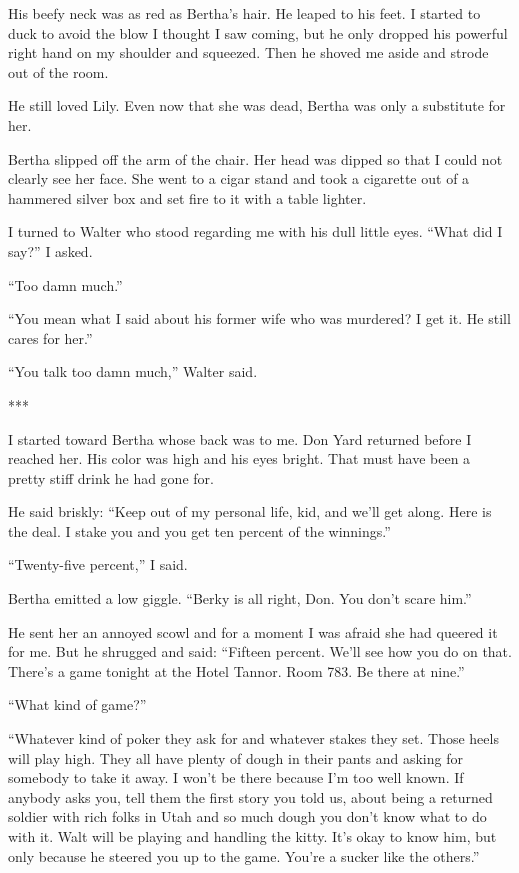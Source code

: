 \documentclass{novel}
\begin{document}
His beefy neck was as red as Bertha’s hair. He leaped to his feet. I started to duck to avoid the blow I thought I saw coming, but he only dropped his powerful right hand on my shoulder and squeezed. Then he shoved me aside and strode out of the room.

He still loved Lily. Even now that she was dead, Bertha was only a substitute for her.

Bertha slipped off the arm of the chair. Her head was dipped so that I could not clearly see her face. She went to a cigar stand and took a cigarette out of a hammered silver box and set fire to it with a table lighter.

I turned to Walter who stood regarding me with his dull little eyes. “What did I say?” I asked.

“Too damn much.”

“You mean what I said about his former wife who was murdered? I get it. He still cares for her.”

“You talk too damn much,” Walter said.

***

I started toward Bertha whose back was to me. Don Yard returned before I reached her. His color was high and his eyes bright. That must have been a pretty stiff drink he had gone for.

He said briskly: “Keep out of my personal life, kid, and we’ll get along. Here is the deal. I stake you and you get ten percent of the winnings.”

“Twenty-five percent,” I said.

Bertha emitted a low giggle. “Berky is all right, Don. You don’t scare him.”

He sent her an annoyed scowl and for a moment I was afraid she had queered it for me. But he shrugged and said: “Fifteen percent. We’ll see how you do on that. There’s a game tonight at the Hotel Tannor. Room 783. Be there at nine.”

“What kind of game?”

“Whatever kind of poker they ask for and whatever stakes they set. Those heels will play high. They all have plenty of dough in their pants and asking for somebody to take it away. I won’t be there because I’m too well known. If anybody asks you, tell them the first story you told us, about being a returned soldier with rich folks in Utah and so much dough you don’t know what to do with it. Walt will be playing and handling the kitty. It’s okay to know him, but only because he steered you up to the game. You’re a sucker like the others.”
\end{document}
